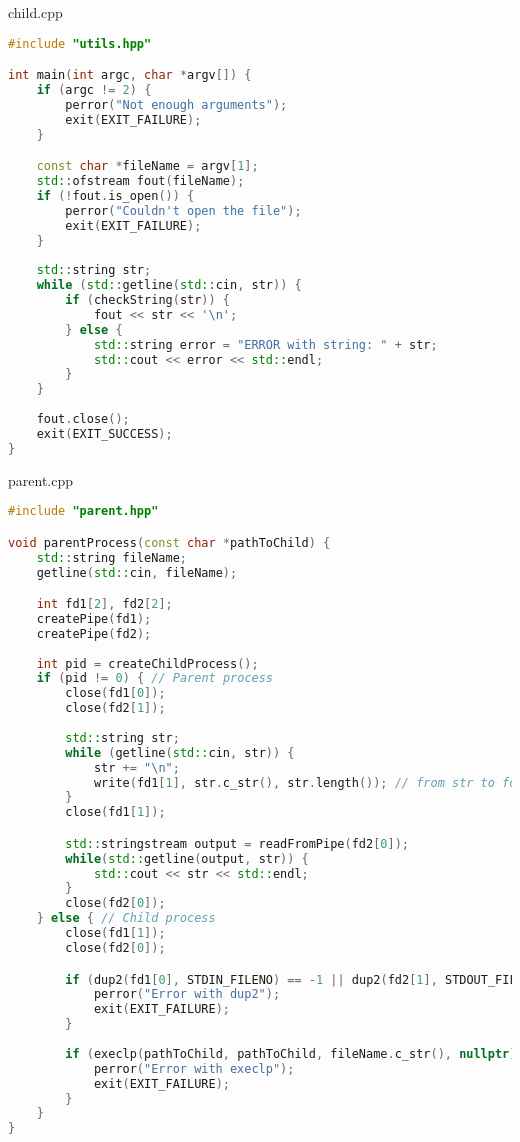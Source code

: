 \documentclass[a4paper, 12pt]{article}
\begin{document}
child.cpp
\begin{lstlisting}[language=C++]
#include "utils.hpp"

int main(int argc, char *argv[]) {
    if (argc != 2) {
        perror("Not enough arguments");
        exit(EXIT_FAILURE);
    }

    const char *fileName = argv[1];
    std::ofstream fout(fileName);
    if (!fout.is_open()) {
        perror("Couldn't open the file");
        exit(EXIT_FAILURE);
    }
    
    std::string str;
    while (std::getline(std::cin, str)) {
        if (checkString(str)) {
            fout << str << '\n';
        } else {
            std::string error = "ERROR with string: " + str;
            std::cout << error << std::endl;
        }
    }
    
    fout.close();  
    exit(EXIT_SUCCESS);  
}
\end{lstlisting}

parent.cpp
\begin{lstlisting}[language=C++]
#include "parent.hpp"

void parentProcess(const char *pathToChild) {
    std::string fileName;
    getline(std::cin, fileName);

    int fd1[2], fd2[2];
    createPipe(fd1);
    createPipe(fd2);
    
    int pid = createChildProcess();
    if (pid != 0) { // Parent process
        close(fd1[0]);
        close(fd2[1]);
        
        std::string str;
        while (getline(std::cin, str)) {
            str += "\n";
            write(fd1[1], str.c_str(), str.length()); // from str to fd1[1]
        }
        close(fd1[1]);

        std::stringstream output = readFromPipe(fd2[0]);
        while(std::getline(output, str)) {
            std::cout << str << std::endl;
        }
        close(fd2[0]);
    } else { // Child process
        close(fd1[1]);
        close(fd2[0]);

        if (dup2(fd1[0], STDIN_FILENO) == -1 || dup2(fd2[1], STDOUT_FILENO) == -1) {
            perror("Error with dup2");
            exit(EXIT_FAILURE);
        }
        
        if (execlp(pathToChild, pathToChild, fileName.c_str(), nullptr) == -1) { // to child.cpp
            perror("Error with execlp");
            exit(EXIT_FAILURE);
        } 
    }
}
\end{lstlisting}
\end{document}
